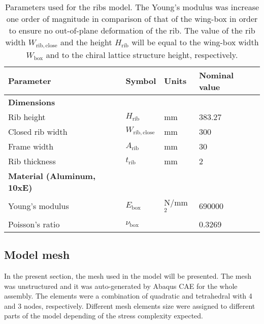 \begin{table}[!htpb]
\centering
\begin{tabular}{|l|lll|}
\hline
\textbf{Parameter} & \multicolumn{1}{l|}{\textbf{Symbol}} & \multicolumn{1}{l|}{\textbf{Units}} & \textbf{Nominal value} \\ \hline \hline
{\textbf{Dimensions}} &  &  &  \\ \hline
Rib height & \multicolumn{1}{l|}{$H_{\mathrm{rib}}$} & \multicolumn{1}{l|}{mm} & 383.27 \\ \hline
Closed rib width & \multicolumn{1}{l|}{$W_{\mathrm{rib,close}}$} & \multicolumn{1}{l|}{mm} & 300 \\ \hline
Frame width & \multicolumn{1}{l|}{$A_{\mathrm{rib}}$} & \multicolumn{1}{l|}{mm} & 30 \\ \hline
Rib thickness & \multicolumn{1}{l|}{$t_{\mathrm{rib}}$} & \multicolumn{1}{l|}{mm} & 2 \\ \hline \hline
{\textbf{Material (Aluminum, 10xE)}} &  &  &  \\ \hline
Young's modulus & \multicolumn{1}{l|}{$E_{\mathrm{box}}$} & \multicolumn{1}{l|}{N/mm$^2$} & 690000 \\ \hline
Poisson's ratio & \multicolumn{1}{l|}{$\nu_{\mathrm{box}}$} & \multicolumn{1}{l|}{} & 0.3269 \\ \hline
\end{tabular}
\caption[Parameters used for the ribs model]{Parameters used for the ribs model. The Young's modulus was increase one order of magnitude in comparison of that of the wing-box in order to ensure no out-of-plane deformation of the rib. The value of the rib width $W_{\mathrm{rib,close}}$ and the height $H_{\mathrm{rib}}$ will be equal to the wing-box width $W_{\mathrm{box}}$ and to the chiral lattice structure height, respectively.}
\label{tab:parameters_rib}
\end{table}

\clearpage
\subsection{Model mesh} \label{subsec:mesh_computationalModel}

In the present section, the mesh used in the model will be presented. The mesh was unstructured and it was auto-generated by Abaqus CAE for the whole assembly. The elements were a combination of quadratic and tetrahedral with 4 and 3 nodes, respectively. Different mesh elements size were assigned to different parts of the model depending of the stress complexity expected. 

